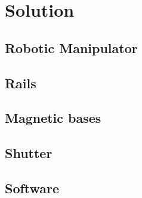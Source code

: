 \section{Solution}




\subsection{Robotic Manipulator}

\subsection{Rails}

\subsection{Magnetic bases}

\subsection{Shutter}

\subsection{Software}